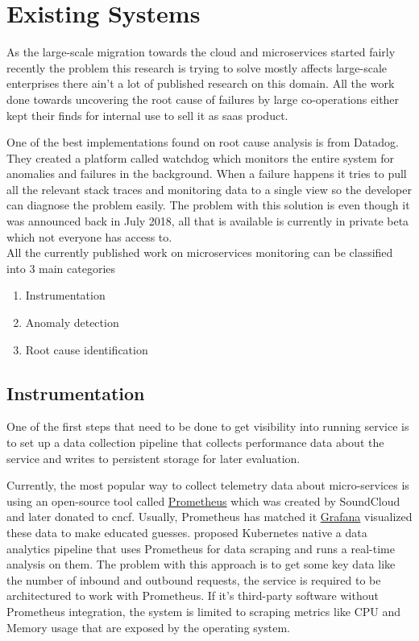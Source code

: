 \section{Existing Systems}

As the large-scale migration towards the cloud and microservices started fairly recently the problem this research is trying to solve mostly affects large-scale enterprises there ain't a lot of published research on this domain. All the work done towards uncovering the root cause of failures by large co-operations either kept their finds for internal use to sell it as \ac{saas} product. 

One of the best implementations found on root cause analysis is from Datadog. They created a platform called watchdog \citep{Watchdog76:online} which monitors the entire system for anomalies and failures in the background. When a failure happens it tries to pull all the relevant stack traces and monitoring data to a single view so the developer can diagnose the problem easily. The problem with this solution is even though it was announced back in July 2018, all that is available is currently in private beta which not everyone has access to.
\\
All the currently published work on microservices monitoring can be classified into 3 main categories
\begin{enumerate}
\item Instrumentation
\item Anomaly detection
\item Root cause identification
\end{enumerate}

\subsection{Instrumentation}
One of the first steps that need to be done to get visibility into running service is to set up a data collection pipeline that collects performance data about the service and writes to persistent storage for later evaluation. 

Currently, the most popular way to collect telemetry data about micro-services is using an open-source tool called \href{https://prometheus.io/}{Prometheus} which was created by SoundCloud and later donated to \ac{cncf}. Usually, Prometheus has matched it \href{https://grafana.com/}{Grafana} visualized these data to make educated guesses. \cite{toka2021predicting} proposed Kubernetes native a data analytics pipeline that uses Prometheus for data scraping and runs a real-time analysis on them. The problem with this approach is to get some key data like the number of inbound and outbound requests, the service is required to be architectured to work with Prometheus. If it's third-party software without Prometheus integration, the system is limited to scraping metrics like CPU and Memory usage that are exposed by the operating system.

